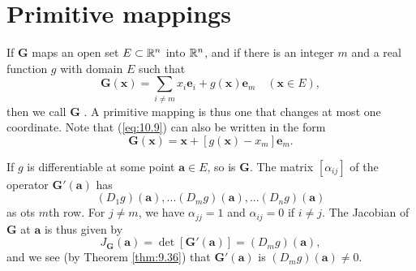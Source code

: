 
\section{Primitive mappings}


\begin{mydef}
    \label{mydef:10.5}
    If $\mathbf{G}$ maps an open set $E \subset {\protect\mathbb R}^n$ into ${\protect\mathbb R}^n$,
    and if there is an integer $m$ and a real function $g$ with domain $E$ such that
    \begin{equation}
        \label{eq:10.9}
        \mathbf{G(x)} = \sum_{i \neq m} x_i \mathbf{e}_i + g(\mathbf{x}) \mathbf{e}_m
        \quad
        (\mathbf{x} \in E) ,
    \end{equation}
    then we call $\mathbf{G}$ .
    A primitive mapping is thus one that changes at most one coordinate.
    Note that (\ref{eq:10.9}) can also be written in the form
    \begin{equation}
        \label{eq:10.10}
        \mathbf{G(x)} = \mathbf{x} + \left[ g(\mathbf{x}) - x_m \right] \mathbf{e}_m .
    \end{equation}

    If $g$ is differentiable at some point $\mathbf{a} \in E$, so is $\mathbf{G}$.
    The matrix $[\alpha_{ij}]$ of the operator $\mathbf{G'(a)}$ has
    \begin{equation}
        \label{eq:10.11}
        (D_1 g)(\mathbf{a}),...
        (D_m g)(\mathbf{a}),...
        (D_n g)(\mathbf{a})
    \end{equation}
    as ots $m$th row.
    For $j \neq m$, we have $\alpha_{jj} = 1$ and $\alpha_{ij} = 0$ if $i \neq j$.
    The Jacobian of $\mathbf{G}$ at $\mathbf{a}$ is thus given by
    \begin{equation}
        \label{eq:10.12}
        J_{\mathbf{G}}(\mathbf{a}) =
        \det [\mathbf{G'(a)}] =
        (D_m g)(\mathbf{a}),
    \end{equation}
    and we see (by Theorem \ref{thm:9.36}) that $\mathbf{G'(a)}$ is
     $(D_m g)(\mathbf{a}) \neq 0$.
\end{mydef}

